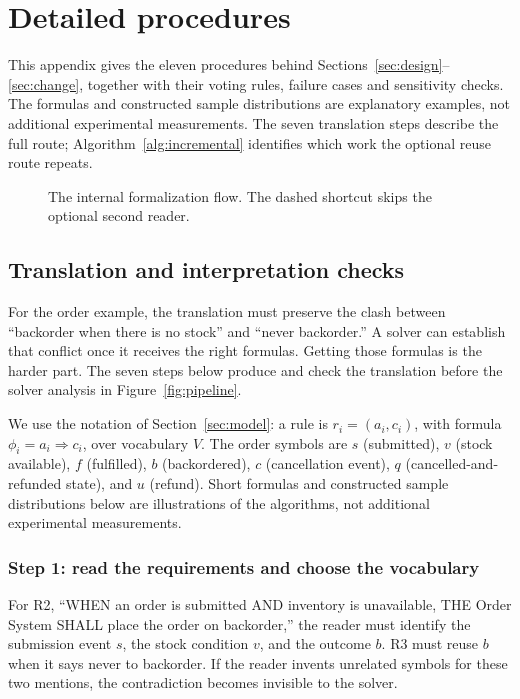 \section{Detailed procedures}\label{app:procedures}

This appendix gives the eleven procedures behind Sections~\ref{sec:design}--\ref{sec:change}, together with their voting rules, failure cases and sensitivity checks. The formulas and constructed sample distributions are explanatory examples, not additional experimental measurements. The seven translation steps describe the full route; Algorithm~\ref{alg:incremental} identifies which work the optional reuse route repeats.
\begin{figure}[H]
\centering
\resizebox{\linewidth}{!}{}
\caption{The internal formalization flow. The dashed shortcut skips the optional second reader.}\label{fig:seven}
\end{figure}

\subsection{Translation and interpretation checks}\label{app:formalize}

For the order example, the translation must preserve the clash between
``backorder when there is no stock'' and ``never backorder.'' A solver can
establish that conflict once it receives the right formulas. Getting those
formulas is the harder part. The seven steps below produce and check the
translation before the solver analysis in Figure~\ref{fig:pipeline}.

We use the notation of Section~\ref{sec:model}: a rule is
$r_i=(a_i,c_i)$, with formula $\phi_i=a_i\Rightarrow c_i$, over vocabulary
$V$. The order symbols are $s$ (submitted), $v$ (stock available), $f$
(fulfilled), $b$ (backordered), $c$ (cancellation event), $q$
(cancelled-and-refunded state), and $u$ (refund). Short formulas and
constructed sample distributions below are illustrations of the algorithms,
not additional experimental measurements.

\subsubsection{Step 1: read the requirements and choose the vocabulary}
For R2, ``WHEN an order is submitted AND inventory is unavailable, THE
Order System SHALL place the order on backorder,'' the reader must identify
the submission event $s$, the stock condition $v$, and the outcome $b$.
R3 must reuse $b$ when it says never to backorder. If the reader invents
unrelated symbols for these two mentions, the contradiction becomes
invisible to the solver.


